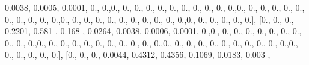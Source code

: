 \documentclass[
]{book}
\newenvironment{Shaded}{\begin{snugshade}}{\end{snugshade}}
\newcommand{\FloatTok}[1]{\textcolor[rgb]{0.00,0.00,0.81}{#1}}
\newcommand{\NormalTok}[1]{#1}
\begin{document}
\begin{Shaded}
\begin{Highlighting}[]
\FloatTok{0.0038}\NormalTok{, }\FloatTok{0.0005}\NormalTok{, }\FloatTok{0.0001}\NormalTok{, }\FloatTok{0.}\NormalTok{, }\FloatTok{0.}\NormalTok{,}\FloatTok{0.}\NormalTok{, }\FloatTok{0.}\NormalTok{, }\FloatTok{0.}\NormalTok{, }\FloatTok{0.}\NormalTok{, }\FloatTok{0.}\NormalTok{, }\FloatTok{0.}\NormalTok{, }\FloatTok{0.}\NormalTok{, }\FloatTok{0.}\NormalTok{, }\FloatTok{0.}\NormalTok{, }\FloatTok{0.}\NormalTok{, }\FloatTok{0.}\NormalTok{,}\FloatTok{0.}\NormalTok{,}
\FloatTok{0.}\NormalTok{, }\FloatTok{0.}\NormalTok{, }\FloatTok{0.}\NormalTok{, }\FloatTok{0.}\NormalTok{, }\FloatTok{0.}\NormalTok{, }\FloatTok{0.}\NormalTok{, }\FloatTok{0.}\NormalTok{, }\FloatTok{0.}\NormalTok{, }\FloatTok{0.}\NormalTok{, }\FloatTok{0.}\NormalTok{,}\FloatTok{0.}\NormalTok{, }\FloatTok{0.}\NormalTok{, }\FloatTok{0.}\NormalTok{, }\FloatTok{0.}\NormalTok{, }\FloatTok{0.}\NormalTok{, }\FloatTok{0.}\NormalTok{, }\FloatTok{0.}\NormalTok{, }\FloatTok{0.}\NormalTok{, }\FloatTok{0.}\NormalTok{, }\FloatTok{0.}\NormalTok{,}
\FloatTok{0.}\NormalTok{,}\FloatTok{0.}\NormalTok{, }\FloatTok{0.}\NormalTok{, }\FloatTok{0.}\NormalTok{, }\FloatTok{0.}\NormalTok{, }\FloatTok{0.}\NormalTok{, }\FloatTok{0.}\NormalTok{], [}\FloatTok{0.}\NormalTok{, }\FloatTok{0.}\NormalTok{, }\FloatTok{0.}\NormalTok{, }\FloatTok{0.2201}\NormalTok{, }\FloatTok{0.581}\NormalTok{ , }\FloatTok{0.168}\NormalTok{ , }\FloatTok{0.0264}\NormalTok{, }\FloatTok{0.0038}\NormalTok{,}
\FloatTok{0.0006}\NormalTok{, }\FloatTok{0.0001}\NormalTok{, }\FloatTok{0.}\NormalTok{,}\FloatTok{0.}\NormalTok{, }\FloatTok{0.}\NormalTok{, }\FloatTok{0.}\NormalTok{, }\FloatTok{0.}\NormalTok{, }\FloatTok{0.}\NormalTok{, }\FloatTok{0.}\NormalTok{, }\FloatTok{0.}\NormalTok{, }\FloatTok{0.}\NormalTok{, }\FloatTok{0.}\NormalTok{, }\FloatTok{0.}\NormalTok{, }\FloatTok{0.}\NormalTok{,}\FloatTok{0.}\NormalTok{, }\FloatTok{0.}\NormalTok{, }\FloatTok{0.}\NormalTok{, }\FloatTok{0.}\NormalTok{,}
\FloatTok{0.}\NormalTok{, }\FloatTok{0.}\NormalTok{, }\FloatTok{0.}\NormalTok{, }\FloatTok{0.}\NormalTok{, }\FloatTok{0.}\NormalTok{, }\FloatTok{0.}\NormalTok{, }\FloatTok{0.}\NormalTok{,}\FloatTok{0.}\NormalTok{, }\FloatTok{0.}\NormalTok{, }\FloatTok{0.}\NormalTok{, }\FloatTok{0.}\NormalTok{, }\FloatTok{0.}\NormalTok{, }\FloatTok{0.}\NormalTok{, }\FloatTok{0.}\NormalTok{, }\FloatTok{0.}\NormalTok{, }\FloatTok{0.}\NormalTok{, }\FloatTok{0.}\NormalTok{, }\FloatTok{0.}\NormalTok{,}\FloatTok{0.}\NormalTok{, }\FloatTok{0.}\NormalTok{,}
\FloatTok{0.}\NormalTok{, }\FloatTok{0.}\NormalTok{, }\FloatTok{0.}\NormalTok{, }\FloatTok{0.}\NormalTok{], [}\FloatTok{0.}\NormalTok{, }\FloatTok{0.}\NormalTok{, }\FloatTok{0.}\NormalTok{, }\FloatTok{0.0044}\NormalTok{, }\FloatTok{0.4312}\NormalTok{, }\FloatTok{0.4356}\NormalTok{, }\FloatTok{0.1069}\NormalTok{, }\FloatTok{0.0183}\NormalTok{, }\FloatTok{0.003}\NormalTok{ ,}

\end{Highlighting}
\end{Shaded}
\end{document}
